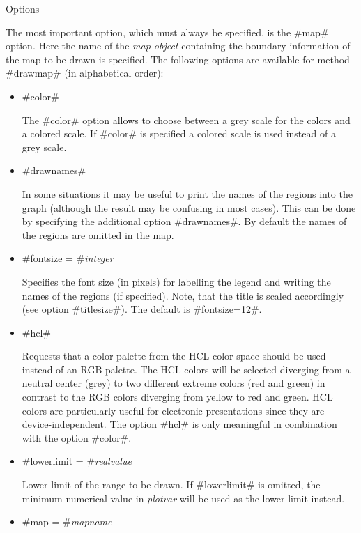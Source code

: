 \begin{stanza}{Options}

{The most important option, which must always be specified, is the
#map# option. Here the name of the {\em map object} containing the
boundary information of the map to be drawn is specified. The
following options are available for method #drawmap# (in
alphabetical order):}
\end{stanza}

\begin{itemize}
\item #color#

The #color# option allows to choose between a grey scale for the
colors and a colored scale. If #color# is specified a colored
scale is used instead of a grey scale.

\item #drawnames#

In some situations it may be useful to print the names of the
regions into the graph (although the result may be confusing in
most cases). This can be done by specifying the additional option
#drawnames#. By default the names of the regions are omitted in
the map.

\item #fontsize = #{\em integer}

Specifies the font size (in pixels) for labelling the legend and
writing the names of the regions (if specified). Note, that the
title is scaled accordingly (see option #titlesize#). The default is
#fontsize=12#.

\item #hcl#

Requests that a color palette from the HCL color space should be
used instead of an RGB palette. The HCL colors will be selected
diverging from a neutral center (grey) to two different extreme
colors (red and green) in contrast to the RGB colors diverging from
yellow to red and green. HCL colors are particularly useful for
electronic presentations since they are device-independent. The
option #hcl# is only meaningful in combination with the option
#color#.

\item #lowerlimit = #{\em realvalue}

Lower limit of the range to be drawn. If #lowerlimit# is omitted,
the minimum numerical value in {\em plotvar} will be used as the
lower limit instead.

\item #map = #{\em mapname}


\end{itemize}
